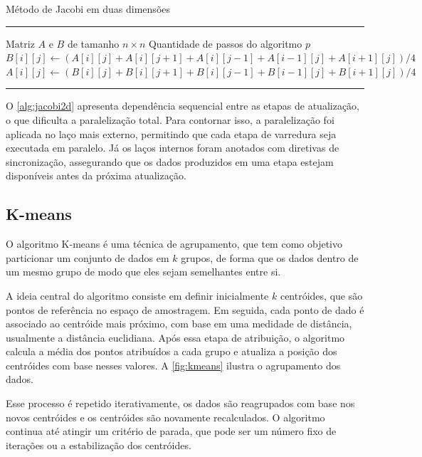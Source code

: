 \begin{algorithm}[htb]
	\caption{Método de Jacobi em duas dimensões}
	\label{alg:jacobi2d}
	\hrule
	\begin{algorithmic}[1]
		\REQUIRE Matriz $A$ e $B$ de tamanho $n \times n$
		\REQUIRE Quantidade de passos do algoritmo $p$
		\STATE $B[i][j] \gets (A[i][j] + A[i][j + 1] + A[i][j - 1] + A[i - 1][j] + A[i + 1][j]) / 4$
		\ENDFOR
		\ENDFOR
		\STATE $A[i][j] \gets (B[i][j] + B[i][j + 1] + B[i][j - 1] + B[i - 1][j] + B[i+1][j]) / 4$
		\ENDFOR
		\ENDFOR
		\ENDFOR
	\end{algorithmic}
	\hrule
	\fonte{}
\end{algorithm}

O \autoref{alg:jacobi2d} apresenta dependência sequencial entre as etapas de atualização, o que dificulta a paralelização total. Para contornar isso, a paralelização foi aplicada no laço mais externo, permitindo que cada etapa de varredura seja executada em paralelo. Já os laços internos foram anotados com diretivas de sincronização, assegurando que os dados produzidos em uma etapa estejam disponíveis antes da próxima atualização.

\subsection{K-means}\label{subsec:kmeans}

O algoritmo K-means é uma técnica de agrupamento, que tem como objetivo particionar um conjunto de dados em $k$ grupos, de forma que os dados dentro de um mesmo grupo de modo que eles sejam semelhantes entre si.

A ideia central do algoritmo consiste em definir inicialmente $k$ centróides, que são pontos de referência no espaço de amostragem. Em seguida, cada ponto de dado é associado ao centróide mais próximo, com base em uma medidade de distância, usualmente a distância euclidiana. Após essa etapa de atribuição, o algoritmo calcula a média dos pontos atribuídos a cada grupo e atualiza a posição dos centróides com base nesses valores. A \autoref{fig:kmeans} ilustra o agrupamento dos dados.

Esse processo é repetido iterativamente, os dados são reagrupados com base nos novos centróides e os centróides são novamente recalculados. O algoritmo continua até atingir um critério de parada, que pode ser um número fixo de iterações ou a estabilização dos centróides.

